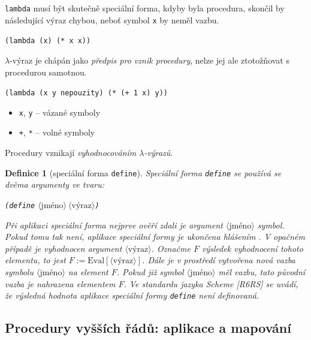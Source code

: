 \documentclass[10pt,a4paper]{article}
\newtheorem{definition}{Definice}
\begin{document}
    \texttt{lambda} musí být skutečně speciální forma, kdyby byla procedura, skončil by následující výraz chybou, neboť symbol \texttt{x} by neměl vazbu.

    \hspace{4ex} \texttt{(lambda (x) (* x x))}

    $\lambda$-výraz je chápán jako \textit{předpis pro vznik procedury}, nelze jej ale ztotožňovat s procedurou samotnou.

    \texttt{(lambda (x y nepouzity) (* (+ 1 x) y))}
    \begin{itemize}
      \item \texttt{x}, \texttt{y} -- vázané symboly
      \item \texttt{+}, \texttt{*} -- volné symboly
    \end{itemize}

    Procedury vznikají \textit{vyhodnocováním $\lambda$-výrazů}.

    \begin{definition}[speciální forma \texttt{define}] Speciální forma \texttt{define} se používá se dvěma argumenty ve tvaru:

      \hspace{4ex} \texttt{(define} $\langle\text{jméno}\rangle\ \langle\text{výraz}\rangle$\texttt{)}

      Při aplikaci speciální forma nejprve ověří zdali je argument $\langle\text{jméno}\rangle$ symbol. Pokud tomu tak není, aplikace speciální formy je ukončena hlášením . V opačném případě je vyhodnocen argument $\langle\text{výraz}\rangle$. Označme $F$ výsledek vyhodnocení tohoto elementu, to jest \mbox{$F:=\text{Eval}[\langle\text{výraz}\rangle]$}. Dále je v prostředí vytvořena nová vazba symbolu $\langle\text{jméno}\rangle$ na element $F$. Pokud již symbol $\langle\text{jméno}\rangle$ měl vazbu, tato původní vazba je nahrazena elementem $F$. Ve standardu jazyka Scheme [R6RS] se uvádí, že výsledná hodnota aplikace speciální formy \texttt{define} není definovaná.
    \end{definition}

  \subsection{Procedury vyšších řádů: aplikace a mapování}
\end{document}
